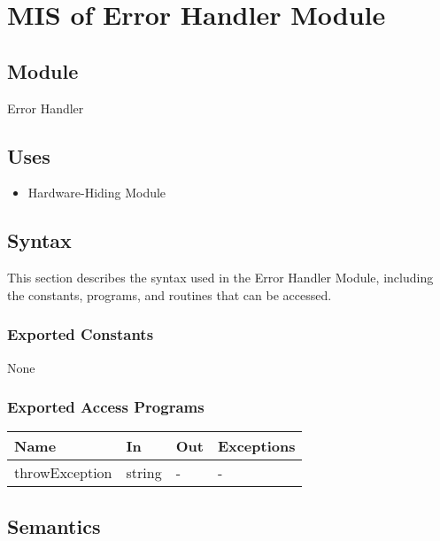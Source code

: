 \documentclass[12pt, titlepage]{article}
\begin{document}
\newpage

\section{MIS of Error Handler Module} \label{MIS_ERROR}

\subsection{Module}

Error Handler

\subsection{Uses}

\begin{itemize}
\item Hardware-Hiding Module
\end{itemize}

\subsection{Syntax}

This section describes the syntax used in the Error Handler Module, including
the constants, programs, and routines that can be accessed.

\subsubsection{Exported Constants}

None

\subsubsection{Exported Access Programs}

\begin{center}
\begin{tabular}{p{3cm} p{4cm} p{4cm} p{2cm}}
\hline
\textbf{Name} & \textbf{In} & \textbf{Out} & \textbf{Exceptions} \\
\hline
throwException & string & - & - \\
\hline
\end{tabular}
\end{center}

\subsection{Semantics}
\end{document}
